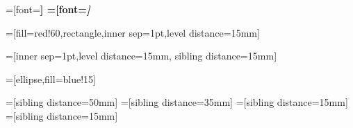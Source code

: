


\newcommand{\rootShape}{ellipse}
\newcommand{\rootFill}{blue!15}
\newcommand{\elShape}{ellipse split}
\newcommand{\elFill}{green!15}
\newcommand{\txtShape}{ellipse split}
\newcommand{\txtFill}{red!10}
\newcommand{\attrShape}{ellipse split}
\newcommand{\attrFill}{red!20}

\newcommand{\textWidthTikz}{1cm}
\newcommand{\tikzLevelDistance}{15mm}
\newcommand{\tikzSiblingDistanceOne}{50mm}
\newcommand{\tikzSiblingDistanceTwo}{35mm}
\newcommand{\tikzSiblingDistanceThree}{15mm}
\newcommand{\tikzSiblingDistanceFour}{15mm}

\newcommand{\tikzElementWithID}[2]{node[\elShape,fill=\elFill] (#1)
{\tikzEl{#2}}}
\newcommand{\tikzElement}[1]{node[\elShape,fill=\elFill] {\tikzEl{#1}}}

\newcommand{\tikzText}[1]{node[\txtShape,fill=\txtFill] {\tikzTx{#1}}}
\newcommand{\tikzAttr}[1]{node[\attrShape,fill=\attrFill,dotted] {\tikzAt{#1}}}

\newcommand{\tikzRoot}{\domtype{Document}}


\newcommand{\tikzEl}[1]{%
  \domtype{Element}
   \nodepart{lower} {#1}
}

\newcommand{\tikzTx}[1]{%
  \domtype{Text}
   \nodepart{lower} {#1}
}

\newcommand{\tikzAt}[1]{%
  \domtype{Attr.}
   \nodepart{lower} {#1}
}

%
%
\newcommand{\tikzDomTree}[2]{%
\begin{figure}
\begin{center}

\begin{small}

\end{small}
   \caption{\label{#1} #2}
   
\end{center}
  \end{figure}
}

%
%
\newcommand{\tikzDomTreeHere}[1]{%
\begin{center}



\end{center}
}


%

=[font=\bf]
=[font=\itshape]

=[fill=red!60,rectangle,inner sep=1pt,level
distance=\tikzLevelDistance]

=[inner sep=1pt,level
distance=\tikzLevelDistance, sibling distance=15mm]

=[\rootShape,fill=\rootFill]

 =[sibling distance=\tikzSiblingDistanceOne]
  =[sibling distance=\tikzSiblingDistanceTwo]
  =[sibling distance=\tikzSiblingDistanceThree]
  =[sibling distance=\tikzSiblingDistanceFour]
  